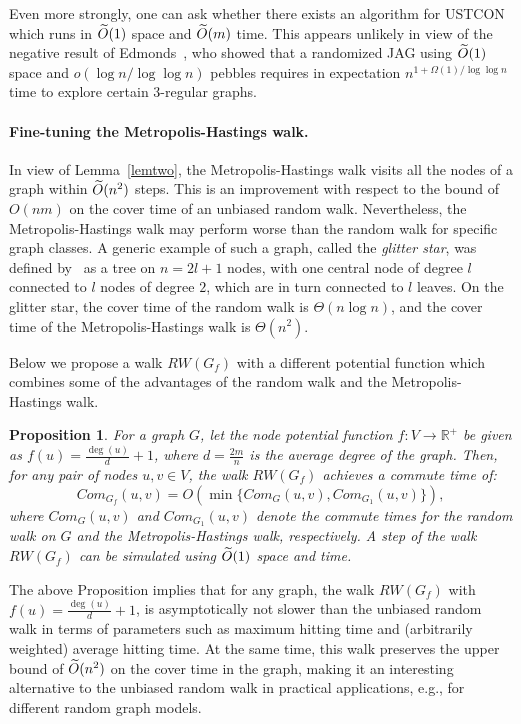 \documentclass[11pt,a4paper]{article}
\newtheorem{proposition}{Proposition}
\renewcommand{\O}{\ensuremath \widetilde O}
\renewcommand{\*}{\hspace*{5mm}}
\begin{document}
Even more strongly, one can ask whether there exists an algorithm for USTCON which runs in $\O(1)$ space and $\O(m)$ time. This appears unlikely in view of the negative result of Edmonds~\cite{E}, who showed that a randomized JAG using $\O(1)$ space and $o(\log n / \log \log n)$ pebbles requires in expectation $n^{1+ \Omega(1)/\log\log n}$ time to explore certain $3$-regular graphs.

\paragraph{Fine-tuning the Metropolis-Hastings walk.}\label{sec52}

In view of Lemma~\ref{lemtwo}, the Metropolis-Hastings walk visits all the nodes of a graph within $\O(n^2)$ steps. This is an improvement with respect to the bound of $O(nm)$ on the cover time of an unbiased random walk. Nevertheless, the Metropolis-Hastings walk may perform worse than the random walk for specific graph classes. A generic example of such a graph, called the \emph{glitter star}, was defined by~\cite{NOSY} as a tree on $n = 2l+1$ nodes, with one central node of degree $l$ connected to $l$ nodes of degree $2$, which are in turn connected to $l$ leaves. On the glitter star, the cover time of the random walk is $\Theta(n \log n)$, and the cover time of the Metropolis-Hastings walk is $\Theta(n^2)$.

Below we propose a walk $RW(G_f)$ with a different potential function which combines some of the advantages of the random walk and the Metropolis-Hastings walk.

\begin{proposition}\label{probla}
For a graph $G$, let the node potential function $f : V \to \mathbb{R}^+$ be given as $f(u) = \frac{\deg(u)}{d} + 1$, where $d = \frac{2m}{n}$ is the average degree of the graph.  Then, for any pair of nodes $u,v\in V$, the walk $RW(G_f)$ achieves a commute time of:
$$
Com_{G_f}(u,v) = O(\min\{Com_{G}(u,v),Com_{G_1}(u,v)\}),
$$
where $Com_{G}(u,v)$ and $Com_{G_1}(u,v)$ denote the commute times for the random walk on $G$ and the Metropolis-Hastings walk, respectively. A step of the walk $RW(G_f)$ can be simulated using $\O(1)$ space and time.
\end{proposition}

The above Proposition implies that for any graph, the walk $RW(G_f)$ with $f(u) = \frac{\deg(u)}{d} + 1$, is asymptotically not slower than the unbiased random walk in terms of parameters such as maximum hitting time and (arbitrarily weighted) average hitting time. At the same time, this walk preserves the upper bound of $\O(n^2)$ on the cover time in the graph, making it an interesting alternative to the unbiased random walk in practical applications, e.g., for different random graph models.
\end{document}
